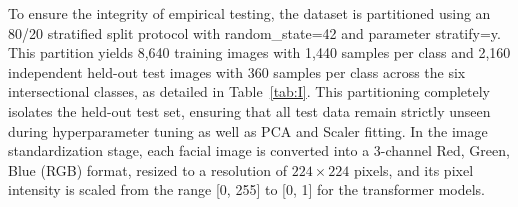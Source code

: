 To ensure the integrity of empirical testing, the dataset is partitioned using an 80/20 stratified split protocol with random\_state=42 and parameter stratify=y. This partition yields 8,640 training images with 1,440 samples per class and 2,160 independent held-out test images with 360 samples per class across the six intersectional classes, as detailed in Table~\ref{tab:I}. This partitioning completely isolates the held-out test set, ensuring that all test data remain strictly unseen during hyperparameter tuning as well as PCA and Scaler fitting. In the image standardization stage, each facial image is converted into a 3-channel Red, Green, Blue (RGB) format, resized to a resolution of $224 \times 224$ pixels, and its pixel intensity is scaled from the range [0, 255] to [0, 1] for the transformer models.
